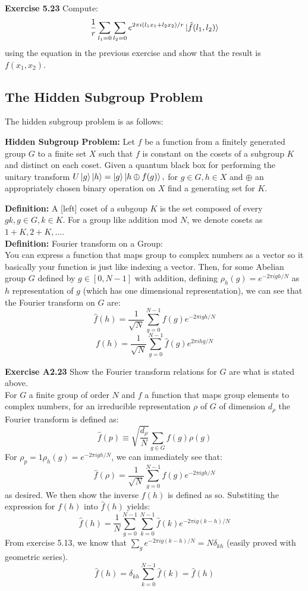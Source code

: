 \documentclass{article}
\begin{document}
\begin{tcolorbox}\textbf{Exercise 5.23} Compute:
	$$\frac{1}{r}\sum_{l_1 = 0} \sum_{l_2 = 0} e^{2\pi i (l_1 x_1 + l_2 x_2)/r} \ket{\hat{f}(l_1, l_2)}$$ using the equation in the previous exercise and show that the result is $f(x_1,x_2).$
\end{tcolorbox}
\subsection{The Hidden Subgroup Problem}
The hidden subgroup problem is as follows:
\begin{tcolorbox}\textbf{Hidden Subgroup Problem:}
	Let $f$ be a function from a finitely generated group $G$ to a finite set $X$ such that $f$ is constant on the cosets of a subgroup $K$ and distinct on each coset. Given a quantum black box for performing the unitary transform $U \ket{g} \ket{h} = \ket{g} \ket{h \oplus f(g)},$ for $g \in G, h \in X$ and $\oplus$ an appropriately chosen binary operation on $X$ find a generating set for $K$.\\

\end{tcolorbox}
\textbf{Definition:}
A [left] coset of a subgoup $K$ is the set composed of every $gk, g \in G, k \in K$. For a group like addition mod $N$, we denote cosets as $1 + K , 2 + K, ...$.\\
\textbf{Definition:} Fourier transform on a Group:\\
You can express a function that maps group to complex numbers as a vector so it basically your function is just like indexing a vector. Then, for some Abelian group $G$ defined by $g \in [0, N-1]$ with addition, defining $\rho_h(g) = e^{-2\pi igh/N}$ as $h$ representation of $g$ (which has one dimensional representation), we can see that the Fourier transform on $G$ are:
$$\hat{f}(h) = \frac{1}{\sqrt{N}} \sum_{g=0}^{N-1} f(g) e^{-2\pi i gh/N}$$
$$f(h) = \frac{1}{\sqrt{N}} \sum_{g=0}^{N-1} \hat{f}(g) e^{2\pi i h g/ N}$$
\begin{tcolorbox}\textbf{Exercise A2.23} Show the Fourier transform relations for $G$ are what is stated above. \\
	For $G$ a finite group of order $N$ and $f$ a function that maps group elements to complex numbers, for an irreducible representation $\rho$ of $G$ of dimension $d_\rho$ the Fourier transform is defined as:
	$$\hat{f}(p) \equiv \sqrt{\frac{d_\rho}{N}} \sum_{g \in G} f(g) \rho(g)$$
	For $\rho_p = 1 \rho_h(g) = e^{-2\pi i gh/N}$, we can immediately see that:
	$$\hat{f}(\rho)  = \frac{1}{\sqrt{N}} \sum_{g = 0}^{N-1} f(g) e^{-2\pi igh/N}$$
	as desired. We then show the inverse $f(h)$ is defined as so. Substiting the expression for $f(h)$ into $\hat{f}(h)$ yields:
	$$\hat{f}(h) = \frac{1}{N} \sum_{g=0}^{N-1} \sum^{N-1}_{k=0} \hat{f}(k) e^{-2\pi i g(k-h)/N} $$
	From exercise 5.13, we know that $\sum_{g}e^{-2\pi i g(k-h)/N} = N\delta_{kh}$ (easily proved with geometric series).
	$$\hat{f}(h) =  \delta_{kh} \sum^{N-1}_{k=0} \hat{f}(k)  = \hat{f}(h)$$

\end{tcolorbox}
\end{document}
